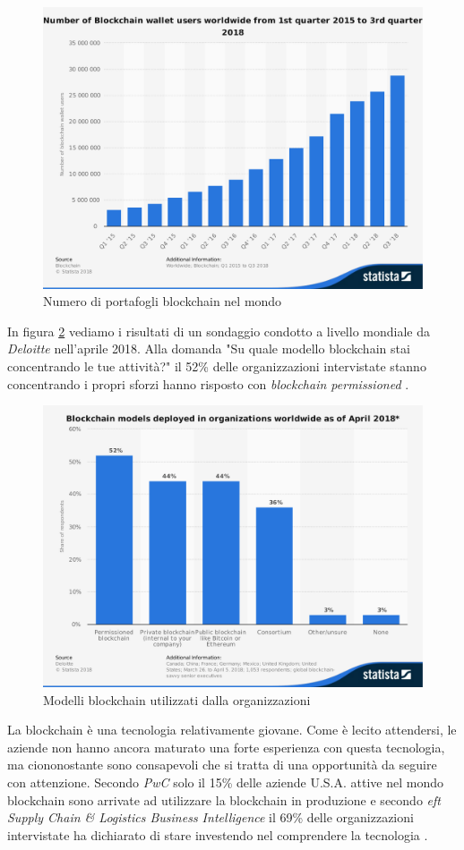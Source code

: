 \begin{figure}[H]
	\centering
	\includegraphics[width=.75\linewidth]{images/chap_intro/number-of-blockchain-wallet.pdf}
	\caption{Numero di portafogli blockchain nel mondo \cite{number-of-blockchain-wallet}}
	\label{fig:number-of-blockchain-wallet}
\end{figure}

In figura \ref{fig:model-focus-for-blockchain}
vediamo i risultati di un sondaggio condotto a livello mondiale da \textit{Deloitte} nell'aprile 2018.
Alla domanda "Su quale modello blockchain stai concentrando le tue attività?"
il 52\% delle organizzazioni intervistate stanno concentrando i propri sforzi hanno risposto con
\textit{blockchain permissioned} \cite{model-focus-for-blockchain}.
\begin{figure}[H]
	\centering
	\includegraphics[width=.75\linewidth]{images/chap_intro/model-focus-for-blockchain.pdf}
	\caption{Modelli blockchain utilizzati dalla organizzazioni \cite{model-focus-for-blockchain}}
	\label{fig:model-focus-for-blockchain}
\end{figure}

La blockchain è una tecnologia relativamente giovane. Come è lecito attendersi, le aziende
non hanno ancora maturato una forte esperienza con questa tecnologia, ma ciononostante
sono consapevoli che si tratta
di una opportunità da seguire con attenzione.
Secondo \textit{PwC} solo il 15\% delle aziende U.S.A.
attive nel mondo blockchain sono arrivate ad utilizzare
la blockchain in produzione \cite{stages-of-blockchain-incorporation} e secondo
\textit{eft Supply Chain \& Logistics Business Intelligence}
il 69\% delle organizzazioni intervistate ha dichiarato di stare investendo
nel comprendere la tecnologia \cite{top-spending-in-supply-chain-industry}.


